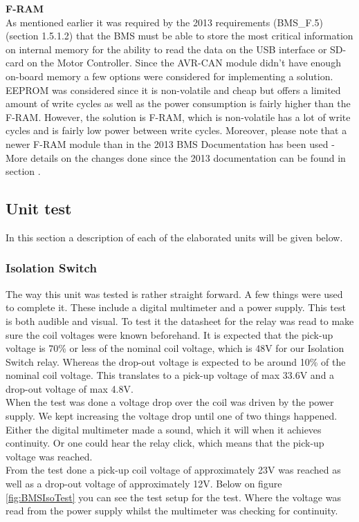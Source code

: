 \textbf{F-RAM}\\
As mentioned earlier it was required by the 2013 requirements (BMS\_F.5)\cite{BMSDocumentation} (section 1.5.1.2) that the BMS must be able to store the most critical information on internal memory for the ability to read the data on the USB interface or SD-card on the Motor Controller. Since the AVR-CAN module didn't have enough on-board memory a few options were considered for implementing a solution. EEPROM was considered since it is non-volatile and cheap but offers a limited amount of write cycles as well as the power consumption is fairly higher than the  F-RAM. However, the solution is F-RAM, which is non-volatile has a lot of write cycles and is fairly low power between write cycles. Moreover, please note that a newer F-RAM module than in the 2013 BMS Documentation has been used - More details on the changes done since the 2013 documentation can be found in section .  

\subsection{Unit test}
In this section a description of each of the elaborated units will be given below. 

\subsubsection{Isolation Switch}
The way this unit was tested is rather straight forward. A few things were used to complete it. These include a digital multimeter and a power supply. This test is both audible and visual. To test it the datasheet\cite{BMSRelay} for the relay was read to make sure the coil voltages were known beforehand. It is expected that the pick-up voltage is 70\% or less of the nominal coil voltage, which is 48V for our Isolation Switch relay. Whereas the drop-out voltage is expected to be around 10\% of the nominal coil voltage. This translates to a pick-up voltage of max 33.6V and a drop-out voltage of max 4.8V.\\
When the test was done a voltage drop over the coil was driven by the power supply. We kept increasing the voltage drop until one of two things happened. Either the digital multimeter made a sound, which it will when it achieves continuity. Or one could hear the relay click, which means that the pick-up voltage was reached.\\
From the test done a pick-up coil voltage of approximately 23V was reached as well as a drop-out voltage of approximately 12V. Below on figure \vref{fig:BMSIsoTest} you can see the test setup for the test. Where the voltage was read from the power supply whilst the multimeter was checking for continuity. 

